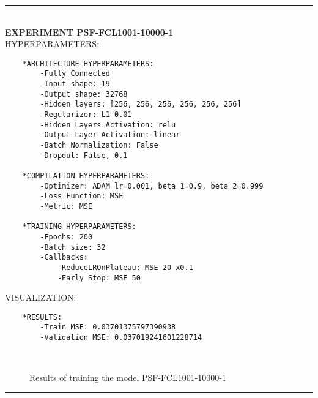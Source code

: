 \rule{0.5\textwidth}{0.5pt}\\

	{\large \textbf{EXPERIMENT PSF-FCL1001-10000-1}}\\
	
	{\normalsize HYPERPARAMETERS:}
	\begin{lstlisting}	
	*ARCHITECTURE HYPERPARAMETERS:
		-Fully Connected
		-Input shape: 19
		-Output shape: 32768
		-Hidden layers: [256, 256, 256, 256, 256, 256]
		-Regularizer: L1 0.01
		-Hidden Layers Activation: relu
		-Output Layer Activation: linear
		-Batch Normalization: False
		-Dropout: False, 0.1
	
	*COMPILATION HYPERPARAMETERS:
		-Optimizer: ADAM lr=0.001, beta_1=0.9, beta_2=0.999
		-Loss Function: MSE
		-Metric: MSE
	
	*TRAINING HYPERPARAMETERS:
		-Epochs: 200
		-Batch size: 32
		-Callbacks: 
			-ReduceLROnPlateau: MSE 20 x0.1
			-Early Stop: MSE 50	
	\end{lstlisting}
	
	{\normalsize VISUALIZATION:}
	\begin{lstlisting}
	*RESULTS:
        -Train MSE: 0.03701375797390938
        -Validation MSE: 0.037019241601228714
	\end{lstlisting}
	
	\begin{figure*}[ht!]
		\hspace{\fill}
		\hspace{\fill}
		\\
		\caption{Results of training the model PSF-FCL1001-10000-1}
	\end{figure*}
	
\FloatBarrier	
\rule{0.5\textwidth}{0.5pt}\\